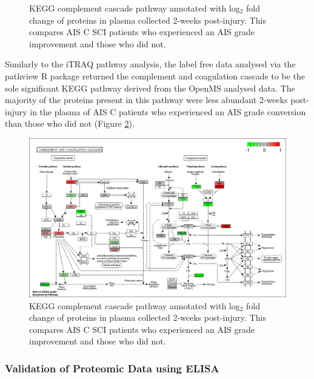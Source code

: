 \documentclass[9pt,lineno]{elife}
\begin{document}
\begin{landscape}
\begin{landscape}
\begin{figure}
{}

\caption{KEGG complement cascade pathway annotated with log\(_2\) fold change of proteins in plasma collected 2-weeks post-injury. This compares AIS C SCI patients who experienced an AIS grade improvement and those who did not.}\label{fig:kegg-complement}
\end{figure}

Similarly to the iTRAQ pathway analysis, the label free data analysed via the pathview R package returned the complement and coagulation cascade to be the sole significant KEGG pathway derived from the OpenMS analysed data.
The majority of the proteins present in this pathway were less abundant 2-weeks post-injury in the plasma of AIS C patients who experienced an AIS grade conversion than those who did not (Figure \ref{fig:kegg-complement-chap4}).



\begin{figure}

{\centering \includegraphics[width=18.31in]{figures/kegg_pathways/hsa04610.pathview_label-free} 

}

\caption{KEGG complement cascade pathway annotated with log\(_2\) fold change of proteins in plasma collected 2-weeks post-injury. This compares AIS C SCI patients who experienced an AIS grade improvement and those who did not.}\label{fig:kegg-complement-chap4}
\end{figure}

\hypertarget{validation-of-proteomic-data-using-elisa}{%
\subsubsection{Validation of Proteomic Data using ELISA}\label{validation-of-proteomic-data-using-elisa}}


\end{landscape}
\end{landscape}
\end{document}
